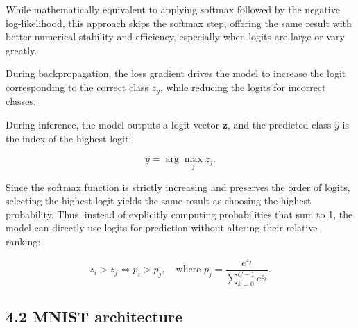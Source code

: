 \documentclass{article}
\begin{document}
\noindent
While mathematically equivalent to applying softmax followed by the negative log-likelihood, this approach skips the softmax step, offering the same result with better numerical stability and efficiency, especially when logits are large or vary greatly.

\vspace{4pt}
\noindent
During backpropagation, the loss gradient drives the model to increase the logit corresponding to the correct class \( z_y \), while reducing the logits for incorrect classes.

\vspace{4pt}
\noindent
During inference, the model outputs a logit vector \( \mathbf{z} \), and the predicted class \( \hat{y} \) is the index of the highest logit:

\[
\hat{y} = \arg\max_j z_j.
\]

\vspace{4pt}
\noindent
Since the softmax function is strictly increasing and preserves the order of logits, selecting the highest logit yields the same result as choosing the highest probability. Thus, instead of explicitly computing probabilities that sum to 1, the model can directly use logits for prediction without altering their relative ranking:

\[
z_i > z_j \iff p_i > p_j,
\quad \text{where } p_j = \frac{e^{z_j}}{\sum_{k=0}^{C-1} e^{z_k}}.
\]








\vspace{1pt}

\subsection*{4.2 MNIST architecture}
\end{document}
